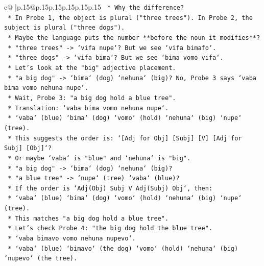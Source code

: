\documentclass{article}
\begin{document}
{\begin{supertabular}{c@{$\;$}|p{.15\linewidth}@{}p{.15\linewidth}p{.15\linewidth}p{.15\linewidth}p{.15\linewidth}p{.15\linewidth}}
{{{\texttt{            *   Why the difference?} \\
\texttt{            *   In Probe 1, the object is plural ("three trees"). In Probe 2, the subject is plural ("three dogs").} \\
\texttt{            *   Maybe the language puts the number **before the noun it modifies**?} \\
\texttt{                *   "three trees" {-}> `vifa nupe`? But we see `vifa bimafo`.} \\
\texttt{                *   "three dogs" {-}> `vifa bima`? But we see `bima vomo vifa`.} \\
\texttt{            *   Let's look at the "big" adjective placement.} \\
\texttt{                *   "a big dog" {-}> `bima` (dog) `nehuna` (big)? No, Probe 3 says `vaba bima vomo nehuna nupe`.} \\
\texttt{                *   Wait, Probe 3: "a big dog hold a blue tree".} \\
\texttt{                *   Translation: `vaba bima vomo nehuna nupe`.} \\
\texttt{                *   `vaba` (blue) `bima` (dog) `vomo` (hold) `nehuna` (big) `nupe` (tree).} \\
\texttt{                *   This suggests the order is: `{[}Adj for Obj{]} {[}Subj{]} {[}V{]} {[}Adj for Subj{]} {[}Obj{]}`?} \\
\texttt{                *   Or maybe `vaba` is "blue" and `nehuna` is "big".} \\
\texttt{                *   "a big dog" {-}> `bima` (dog) `nehuna` (big)?} \\
\texttt{                *   "a blue tree" {-}> `nupe` (tree) `vaba` (blue)?} \\
\texttt{                *   If the order is `Adj(Obj) Subj V Adj(Subj) Obj`, then:} \\
\texttt{                    *   `vaba` (blue) `bima` (dog) `vomo` (hold) `nehuna` (big) `nupe` (tree).} \\
\texttt{                    *   This matches "a big dog hold a blue tree".} \\
\texttt{                *   Let's check Probe 4: "the big dog hold the blue tree".} \\
\texttt{                    *   `vaba bimavo vomo nehuna nupevo`.} \\
\texttt{                    *   `vaba` (blue) `bimavo` (the dog) `vomo` (hold) `nehuna` (big) `nupevo` (the tree).} \\
}}}
\end{supertabular}}
\end{document}
